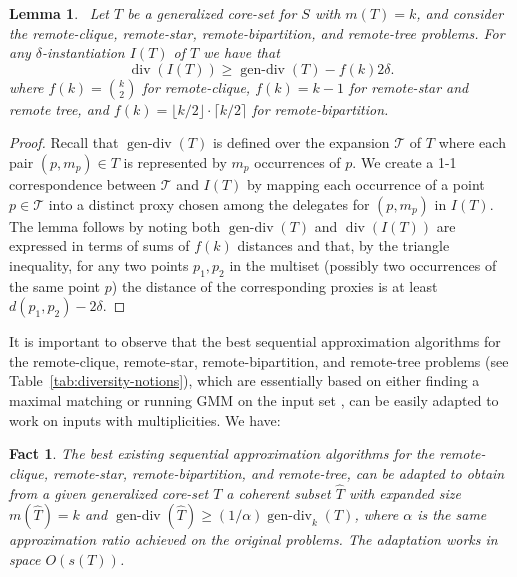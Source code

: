 \documentclass{article}
\newtheorem{lemma}{Lemma}
\newtheorem{fact}{Fact}
\DeclareMathOperator{\diversity}{div}
\DeclareMathOperator{\gendiv}{gen-div}
\newcommand{\BO}[1]{O\left( #1 \right)}
\begin{document}
\begin{lemma}\label{lem-gendiv}
  ~Let $T$ be a generalized core-set for $S$ with $m(T)=k$, and
  consider the remote-clique, remote-star, remote-bipartition, and
  remote-tree problems.  For any ${\delta}$-instantiation $I(T)$ of $T$
  we have that
  \[
    \diversity(I(T)) \geq \gendiv(T) - f(k)2{\delta}.
  \] 
  where $f(k) = {k \choose 2}$ for remote-clique, $f(k) = k-1$ for
  remote-star and remote tree, and
  $f(k) = \lfloor k/2 \rfloor \cdot \lceil k/2 \rceil$ for
  remote-bipartition.
\end{lemma}
\begin{proof}
 Recall that $\gendiv(T)$ is defined over the expansion $\mathcal{T}$
 of $T$ where each pair $(p,m_p) \in T$ is represented by $m_p$
 occurrences of $p$.  We create a 1-1 correspondence between
 $\mathcal{T}$ and $I(T)$ by mapping each occurrence of a point
 $p \in \mathcal{T}$ into a distinct proxy chosen among the delegates
 for $(p,m_p)$ in $I(T)$. The lemma follows by noting both
 $\gendiv(T)$ and $\diversity(I(T))$ are expressed in terms of sums
 of $f(k)$ distances and that, by the triangle inequality, for any
 two points $p_1,p_2$ in the multiset (possibly two occurrences of
 the same point $p$) the distance of the corresponding proxies is at
 least $d(p_1,p_2) - 2{\delta}$.
\end{proof}

It is important to observe that the best sequential approximation
algorithms for the remote-clique, remote-star, remote-bipartition, and
remote-tree problems (see Table~\ref{tab:diversity-notions}), which
are essentially based on either finding a maximal matching or running
{\sc GMM} on the input set
\cite{HassinRT97,ChandraH01,HalldorssonIKT99}, can be easily adapted
to work on inputs with multiplicities. We have:
\begin{fact}\label{fact:gen}
  The best existing sequential approximation algorithms for the
  remote-clique, remote-star, remote-bipartition, and remote-tree, can
  be adapted to obtain from a given generalized core-set $T$ a
  coherent subset $\hat{T}$ with expanded size $m(\hat{T})=k$ and
  $\gendiv(\hat{T}) \ge (1/\alpha) \gendiv_k(T)$, where $\alpha$ is
  the same approximation ratio achieved on the original problems.
  The adaptation works in space $\BO{s(T)}$.
\end{fact}
\end{document}
